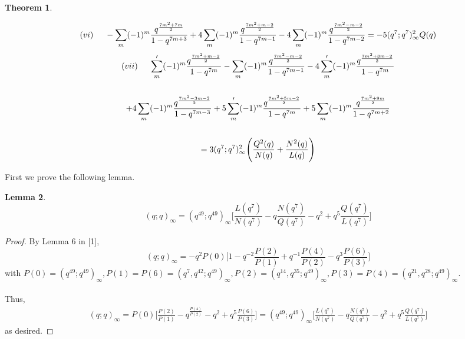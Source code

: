 \documentclass[10pt,reqno]{amsart}
\newtheorem{theorem}{Theorem}[section]
\newtheorem{lemma}[theorem]{Lemma}
\begin{document}
\begin{theorem}
\begin{multline}
\end{multline}
\begin{multline}
    (vi)\hspace{0.5cm} -\displaystyle\sum_{m}(-1)^m\displaystyle\frac{q^{\frac{7m^2+7m}{2}}}{1-q^{7m+3}}+4\displaystyle\sum_{m}(-1)^m\displaystyle\frac{q^{\frac{7m^2+m-2}{2}}}{1-q^{7m-1}}-4\displaystyle\sum_{m}(-1)^m\displaystyle\frac{q^{\frac{7m^2-m-2}{2}}}{1-q^{7m-2}}=-5(q^7;q^7)_{\infty}^2Q(q)
\end{multline}
\begin{multline}
    (vii)\hspace{0.5cm} \displaystyle\sum_{m}'(-1)^m\displaystyle\frac{q^{\frac{7m^2+m-2}{2}}}{1-q^{7m}}-\displaystyle\sum_{m}(-1)^m\displaystyle\frac{q^{\frac{7m^2-m-2}{2}}}{1-q^{7m-1}}-4\displaystyle\sum_{m}'(-1)^m\displaystyle\frac{q^{\frac{7m^2+3m-2}{2}}}{1-q^{7m}}\\ \\
    +4\displaystyle\sum_{m}(-1)^m\displaystyle\frac{q^{\frac{7m^2-3m-2}{2}}}{1-q^{7m-3}}+5\displaystyle\sum_{m}'(-1)^m\displaystyle\frac{q^{\frac{7m^2+5m-2}{2}}}{1-q^{7m}}+5\displaystyle\sum_{m}(-1)^m\displaystyle\frac{q^{\frac{7m^2+9m}{2}}}{1-q^{7m+2}}\\ \\
    =3(q^7;q^7)_{\infty}^2\Bigg(\displaystyle\frac{Q^2(q)}{N(q)}+\displaystyle\frac{N^2(q)}{L(q)}\Bigg)
\end{multline}
\end{theorem}
First we prove the following lemma.
\begin{lemma}
\begin{equation*}
    (q;q)_{\infty}=(q^{49};q^{49})_{\infty}\Bigg[\displaystyle\frac{L(q^7)}{N(q^7)}-q\displaystyle\frac{N(q^7)}{Q(q^7)}-q^2+q^5\displaystyle\frac{Q(q^7)}{L(q^7)}\Bigg]
\end{equation*}
\end{lemma}
\begin{proof}
By Lemma 6 in [1], 
\begin{equation*}
    (q;q)_{\infty}=-q^2P(0)\Bigg[1-q^{-2}\displaystyle\frac{P(2)}{P(1)}+q^{-1}\displaystyle\frac{P(4)}{P(2)}-q^3\displaystyle\frac{P(6)}{P(3)}\Bigg]
\end{equation*}
with $P(0)=(q^{49};q^{49})_{\infty},P(1)=P(6)=(q^7,q^{42};q^{49})_{\infty},P(2)=(q^{14},q^{35};q^{49})_{\infty},P(3)=P(4)=(q^{21},q^{28};q^{49})_{\infty}.$ \\ \\
Thus, 
\begin{multline*}
    (q;q)_{\infty}=P(0)\Bigg[\displaystyle\frac{P(2)}{P(1)}-q^\displaystyle\frac{P(4)}{P(2)}-q^2+q^5\displaystyle\frac{P(6)}{P(3)}\Bigg]=(q^{49};q^{49})_{\infty}\Bigg[\displaystyle\frac{L(q^7)}{N(q^7)}-q\displaystyle\frac{N(q^7)}{Q(q^7)}-q^2+q^5\displaystyle\frac{Q(q^7)}{L(q^7)}\Bigg]
\end{multline*}
as desired.
\end{proof}
\end{document}
